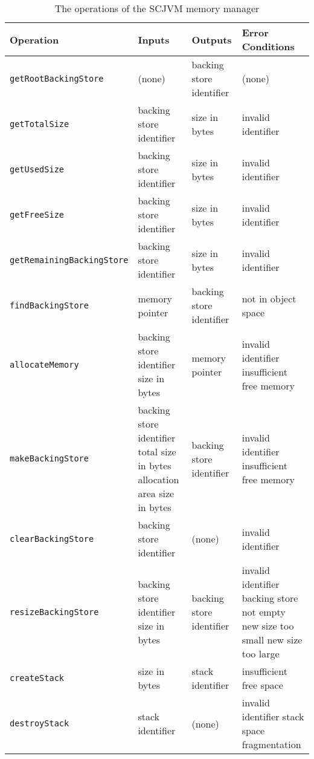 \begin{table*}[ht]
  \centering
  \footnotesize
  \begin{tabular}{|l|p{3.2cm}|p{3.2cm}|p{3.65cm}|}
    Operation & Inputs & Outputs & Error Conditions \\
    \hline
    \texttt{getRootBackingStore} &
    (none) &
    backing store identifier &
    (none)
    \\\texttt{getTotalSize} &
    backing store identifier &
    size in bytes &
    invalid identifier
    \\\texttt{getUsedSize} &
    backing store identifier &
    size in bytes &
    invalid identifier
    \\\texttt{getFreeSize} &
    backing store identifier &
    size in bytes &
    invalid identifier
    \\\texttt{getRemainingBackingStore} &
    backing store identifier &
    size in bytes &
    invalid identifier                           
    \\\texttt{findBackingStore} &
    memory pointer &
    backing store identifier &
    not in object space
    \\\texttt{allocateMemory} &
    backing store identifier \newline
    size in bytes &
    memory pointer &
    invalid identifier \newline
    insufficient free memory
    \\\texttt{makeBackingStore} &
    backing store identifier \newline
    total size in bytes \newline
    allocation area size in bytes &                      
    backing store identifier &
    invalid identifier \newline
    insufficient free memory
    \\\texttt{clearBackingStore} &
    backing store identifier &
    (none) &
    invalid identifier
    \\\texttt{resizeBackingStore} &
    backing store identifier \newline
    size in bytes &
    backing store identifier &
    invalid identifier \newline
    backing store not empty \newline
    new size too small \newline
    new size too large                           
    \\\texttt{createStack} &
    size in bytes &
    stack identifier &
    insufficient free space
    \\\texttt{destroyStack} &
    stack identifier &
    (none) &
    invalid identifier \newline
    stack space fragmentation
  \end{tabular}
  \caption{The operations of the SCJVM memory manager}
  \label{memory-manager-table}
\end{table*}

